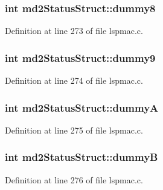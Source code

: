 \hypertarget{structmd2StatusStruct_a17f44367cfa4c66ec3ee481863ef4960}{
\subsubsection[{dummy8}]{\setlength{\rightskip}{0pt plus 5cm}int md2\-Status\-Struct\-::dummy8}}\label{structmd2StatusStruct_a17f44367cfa4c66ec3ee481863ef4960}


Definition at line 273 of file lspmac.\-c.

\hypertarget{structmd2StatusStruct_aa5aadda5a5cb98c6028f8b45e16cd084}{
\subsubsection[{dummy9}]{\setlength{\rightskip}{0pt plus 5cm}int md2\-Status\-Struct\-::dummy9}}\label{structmd2StatusStruct_aa5aadda5a5cb98c6028f8b45e16cd084}


Definition at line 274 of file lspmac.\-c.

\hypertarget{structmd2StatusStruct_a9fc7dc802d00c22463dd7ddd531e06d7}{
\subsubsection[{dummy\-A}]{\setlength{\rightskip}{0pt plus 5cm}int md2\-Status\-Struct\-::dummy\-A}}\label{structmd2StatusStruct_a9fc7dc802d00c22463dd7ddd531e06d7}


Definition at line 275 of file lspmac.\-c.

\hypertarget{structmd2StatusStruct_aab597be69a8dcc140778d9aeb8a50eee}{
\subsubsection[{dummy\-B}]{\setlength{\rightskip}{0pt plus 5cm}int md2\-Status\-Struct\-::dummy\-B}}\label{structmd2StatusStruct_aab597be69a8dcc140778d9aeb8a50eee}


Definition at line 276 of file lspmac.\-c.

